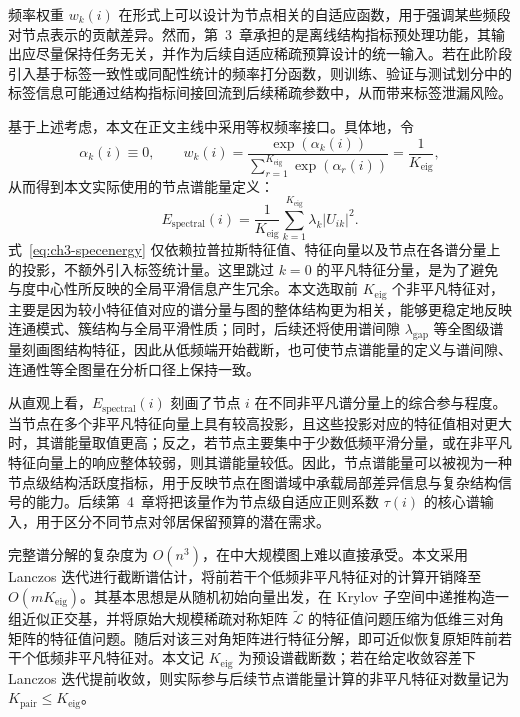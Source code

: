 频率权重 $w_k(i)$ 在形式上可以设计为节点相关的自适应函数，用于强调某些频段对节点表示的贡献差异。然而，第~3~章承担的是离线结构指标预处理功能，其输出应尽量保持任务无关，并作为后续自适应稀疏预算设计的统一输入。若在此阶段引入基于标签一致性或同配性统计的频率打分函数，则训练、验证与测试划分中的标签信息可能通过结构指标间接回流到后续稀疏参数中，从而带来标签泄漏风险。

基于上述考虑，本文在正文主线中采用等权频率接口。具体地，令
\begin{equation}
  \alpha_k(i)\equiv 0,\qquad
  w_k(i)
  =
  \frac{\exp(\alpha_k(i))}
       {\sum_{r=1}^{K_{\mathrm{eig}}}\exp(\alpha_r(i))}
  =
  \frac{1}{K_{\mathrm{eig}}},
  \label{eq:ch3-equal-frequency-weight}
\end{equation}
从而得到本文实际使用的节点谱能量定义：
\begin{equation}
  E_{\text{spectral}}(i)
  =
  \frac{1}{K_{\text{eig}}}
  \sum_{k=1}^{K_{\text{eig}}}
  \lambda_k |U_{ik}|^2.
  \label{eq:ch3-specenergy}
\end{equation}
式~\eqref{eq:ch3-specenergy} 仅依赖拉普拉斯特征值、特征向量以及节点在各谱分量上的投影，不额外引入标签统计量。这里跳过 $k=0$ 的平凡特征分量，是为了避免与度中心性所反映的全局平滑信息产生冗余。本文选取前 $K_{\text{eig}}$ 个非平凡特征对，主要是因为较小特征值对应的谱分量与图的整体结构更为相关，能够更稳定地反映连通模式、簇结构与全局平滑性质；同时，后续还将使用谱间隙 $\lambda_{\text{gap}}$ 等全图级谱量刻画图结构特征，因此从低频端开始截断，也可使节点谱能量的定义与谱间隙、连通性等全图量在分析口径上保持一致。

从直观上看，$E_{\text{spectral}}(i)$ 刻画了节点 $i$ 在不同非平凡谱分量上的综合参与程度。当节点在多个非平凡特征向量上具有较高投影，且这些投影对应的特征值相对更大时，其谱能量取值更高；反之，若节点主要集中于少数低频平滑分量，或在非平凡特征向量上的响应整体较弱，则其谱能量较低。因此，节点谱能量可以被视为一种节点级结构活跃度指标，用于反映节点在图谱域中承载局部差异信息与复杂结构信号的能力。后续第~4~章将把该量作为节点级自适应正则系数 $\tau(i)$ 的核心谱输入，用于区分不同节点对邻居保留预算的潜在需求。

完整谱分解的复杂度为 $O(n^3)$，在中大规模图上难以直接承受。本文采用 Lanczos 迭代\cite{Lanczos1950}进行截断谱估计，将前若干个低频非平凡特征对的计算开销降至 $O(mK_{\text{eig}})$。其基本思想是从随机初始向量出发，在 Krylov 子空间中递推构造一组近似正交基，并将原始大规模稀疏对称矩阵 $\tilde{\mathcal{L}}$ 的特征值问题压缩为低维三对角矩阵的特征值问题。随后对该三对角矩阵进行特征分解，即可近似恢复原矩阵前若干个低频非平凡特征对。本文记 $K_{\text{eig}}$ 为预设谱截断数；若在给定收敛容差下 Lanczos 迭代提前收敛，则实际参与后续节点谱能量计算的非平凡特征对数量记为 $K_{\text{pair}}\leq K_{\text{eig}}$。

